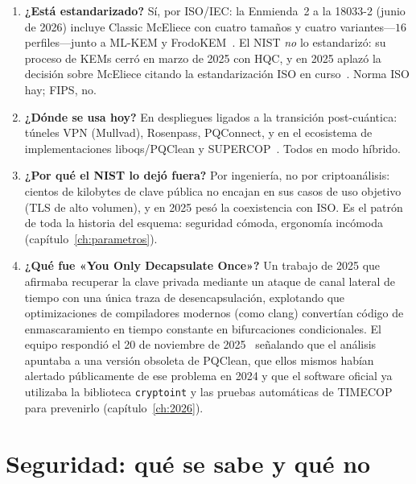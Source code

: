 \documentclass[11pt,a4paper,oneside]{report}
\begin{document}
\begin{enumerate}[leftmargin=1.9em,itemsep=5pt,start=8]
  \item \textbf{¿Está estandarizado?} Sí, por ISO/IEC: la
        Enmienda~2 a la 18033-2 (junio de 2026) incluye Classic
        McEliece con cuatro tamaños y cuatro variantes---$16$
        perfiles---junto a ML-KEM y FrodoKEM~\cite{iso18033,cmiso}.
        El NIST \emph{no} lo estandarizó: su proceso de KEMs cerró
        en marzo de 2025 con HQC, y en 2025 aplazó la decisión sobre
        McEliece citando la estandarización ISO en
        curso~\cite{nist8545,cmnist}. Norma ISO hay; FIPS, no.

  \item \textbf{¿Dónde se usa hoy?} En despliegues ligados a la
        transición post-cuántica: túneles VPN (Mullvad), Rosenpass,
        PQConnect, y en el ecosistema de implementaciones
        liboqs/PQClean y SUPERCOP~\cite{bernstein2026,cmimpl}.
        Todos en modo híbrido.

  \item \textbf{¿Por qué el NIST lo dejó fuera?} Por ingeniería, no
        por criptoanálisis: cientos de kilobytes de clave pública no
        encajan en sus casos de uso objetivo (TLS de alto
        volumen), y en 2025 pesó la coexistencia con ISO. Es el
        patrón de toda la historia del esquema: seguridad cómoda,
        ergonomía incómoda (capítulo~\ref{ch:parametros}).

  \item \textbf{¿Qué fue «You Only Decapsulate Once»?} Un trabajo de
        2025 que afirmaba recuperar la clave privada mediante un ataque de
        canal lateral de tiempo con una única traza de desencapsulación,
        explotando que optimizaciones de compiladores modernos (como clang)
        convertían código de enmascaramiento en tiempo constante en
        bifurcaciones condicionales. El equipo respondió el 20 de noviembre de
        2025~\cite{cm2025yodo} señalando que el análisis apuntaba a una
        versión obsoleta de PQClean, que ellos mismos habían alertado
        públicamente de ese problema en 2024 y que el software oficial ya
        utilizaba la biblioteca \texttt{cryptoint} y las pruebas automáticas
        de TIMECOP para prevenirlo (capítulo~\ref{ch:2026}).
\end{enumerate}

\section{Seguridad: qué se sabe y qué no}
\end{document}
